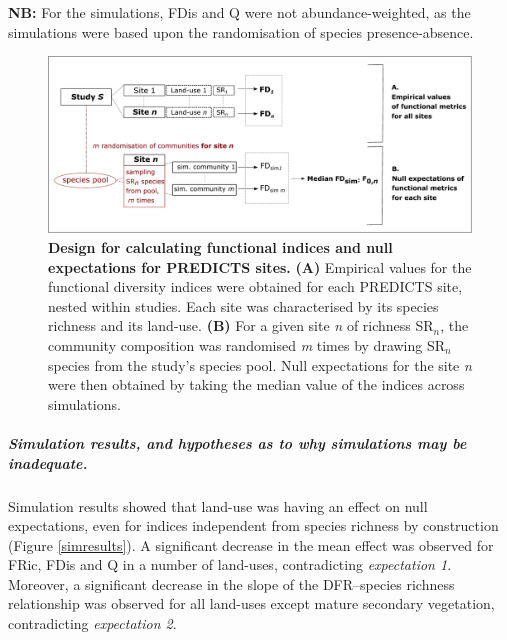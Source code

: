 \textbf{NB:} For the simulations, FDis and Q were not abundance-weighted, as the simulations were based upon the randomisation of species presence-absence. 

\begin{figure}[h!]
\centering
\includegraphics[scale=0.60]{figures/chapter3/chart_FD_calculations}
\caption[Design for calculating functional indices and null expectations for PREDICTS sites]{\textbf{Design for calculating functional indices and null expectations for PREDICTS sites.} \textbf{(A)} Empirical values for the functional diversity indices were obtained for each PREDICTS site, nested within studies. Each site was characterised by its species richness and its land-use. \textbf{(B)} For a given site \textit{n} of richness SR$_{n}$, the community composition was randomised \textit{m} times by drawing SR$_{n}$ species from the study's species pool. Null expectations for the site \textit{n} were then obtained by taking the median value of the indices across simulations.}
\label{FDcalc_chart}
\end{figure}

\subparagraph{Simulation results, and hypotheses as to why simulations may be inadequate.}
Simulation results showed that land-use was having an effect on null expectations, even for indices independent from species richness by construction (Figure \ref{simresults}). A significant decrease in the mean effect was observed for FRic, FDis and Q in a number of land-uses, contradicting \textit{expectation 1}. Moreover, a significant decrease in the slope of the DFR--species richness relationship was observed for all land-uses except mature secondary vegetation, contradicting \textit{expectation 2}. 

